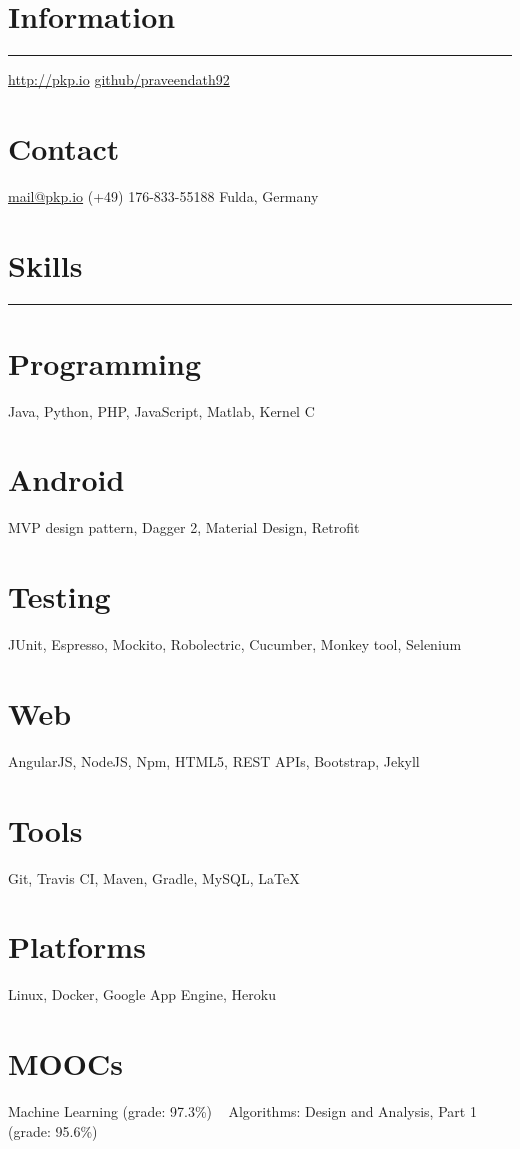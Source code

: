 \documentclass[]{friggeri-cv}
\begin{document}

\begin{aside}
    \section{Information}
        \noindent\rule{3cm}{0.5pt}
        \href{http://pkp.io}{http://pkp.io}
        \href{https://github.com/praveendath92}{github/praveendath92}
    \section{Contact}
        \href{mailto:mail@pkp.io}{mail@pkp.io}
        (+49) 176-833-55188
        Fulda, Germany
    ~
    \section{Skills}
        \noindent\rule{3cm}{0.5pt}
    \section{Programming}
        Java, Python, PHP, JavaScript, Matlab, Kernel C
    \section{Android}
        MVP design pattern, Dagger 2, Material Design, Retrofit
    \section{Testing}
        JUnit, Espresso, Mockito, Robolectric, Cucumber, Monkey tool, Selenium
    \section{Web}
        AngularJS, NodeJS, Npm, HTML5, REST APIs, Bootstrap, Jekyll
    \section{Tools}
        Git, Travis CI, Maven, Gradle, MySQL, \LaTeX
    \section{Platforms}
        Linux, Docker, Google App Engine, Heroku
    \section{MOOCs}
        Machine Learning (grade: 97.3\%)
        ~
        Algorithms: Design and Analysis, Part 1 (grade: 95.6\%)
\end{aside}
~
\end{document}
